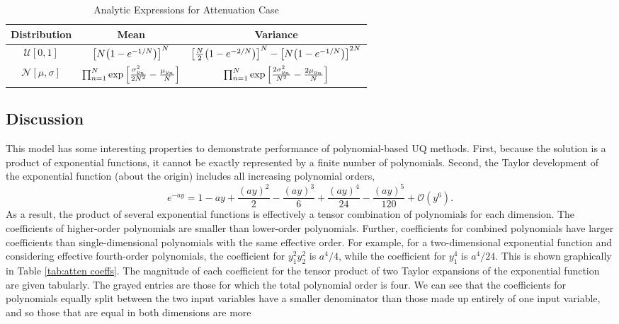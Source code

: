 \begin{table}[H]
  \centering
  \begin{tabular}{c|c|c}
    Distribution & Mean & Variance \\\hline
    $\mathcal{U}[0,1]$ & $\qty[N\qty(1-e^{-1/N})]^N$ & $\qty[\frac{N}{2}\qty(1-e^{-2/N})]^N -
                       \qty[N\qty(1-e^{-1/N})]^{2N}$ \\
    $\mathcal{N}[\mu,\sigma]$ & $\prod_{n=1}^N \exp\qty[\frac{\sigma_{y_n}^2}{2N^2}-\frac{\mu_{y_n}}{N}]$
    & $\prod_{n=1}^N \exp\qty[\frac{2\sigma_{y_n}^2}{N^2} - \frac{2\mu_{y_n}}{N}]$
  \end{tabular}
  \caption{Analytic Expressions for Attenuation Case}
  \label{tab:attenuation moments}
\end{table}

\subsection{Discussion}
This model has some interesting properties to demonstrate performance of polynomial-based UQ methods.  First,
because the solution is a product of exponential functions, it cannot be exactly represented by a finite
number of polynomials.  Second, the Taylor development of the exponential function (about the origin) 
includes all increasing polynomial orders,
\begin{equation}
e^{-ay} = 1 - ay + \frac{(ay)^2}{2} - \frac{(ay)^3}{6} + \frac{(ay)^4}{24} - \frac{(ay)^5}{120} + \mathcal{O}(y^6).
\end{equation}
As a result, the product of several exponential functions is effectively a tensor combination of
polynomials for each dimension.  The coefficients of higher-order polynomials are smaller than lower-order
polynomials.  Further, coefficients for combined polynomials 
have larger coefficients than single-dimensional
polynomials with the same effective order.  For example, for a two-dimensional exponential function and
considering effective fourth-order polynomials, the coefficient for $y_1^2y_2^2$ is $a^4/4$, while the
coefficient for $y_1^4$ is $a^4/24$.  This is shown graphically in Table \ref{tab:atten coeffs}.  The
magnitude of each coefficient for the tensor product of two Taylor expansions of the exponential function are
given tabularly.  The grayed entries are those for which the total polynomial order is four.  We can see
that the coefficients for polynomials equally split between the two input variables have a smaller denominator than
those made up entirely of one input variable, and so those that are equal in both dimensions are more
